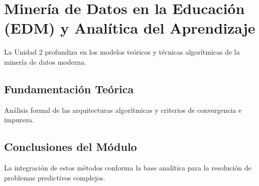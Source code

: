 \section{Minería de Datos en la Educación (EDM) y Analítica del Aprendizaje}
\label{sec:u2_mineria_datos_educacion}
La Unidad 2 profundiza en los modelos teóricos y técnicas algorítmicas de la minería de datos moderna.
\subsection{Fundamentación Teórica}
Análisis formal de las arquitecturas algorítmicas y criterios de convergencia e impureza.

\subsection{Conclusiones del Módulo}
La integración de estos métodos conforma la base analítica para la resolución de problemas predictivos complejos.
